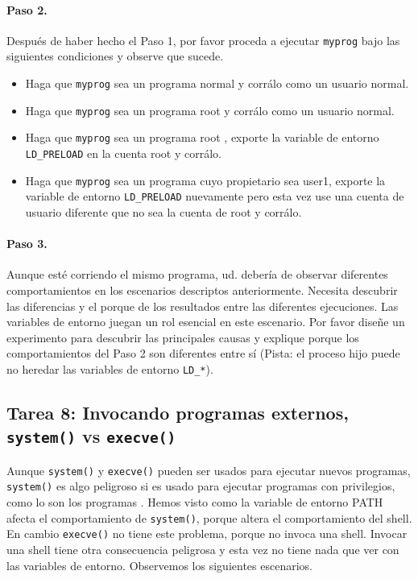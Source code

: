 \paragraph{Paso 2.}
Después de haber hecho el Paso 1, por favor proceda a ejecutar {\tt myprog} bajo las siguientes condiciones y observe que sucede.

  \begin{itemize}
   \item Haga que {\tt myprog} sea un programa normal y corrálo como un usuario normal.
   \item Haga que {\tt myprog} sea un programa root \setuid y corrálo como un usuario normal.
   \item Haga que {\tt myprog} sea un programa root \setuid, exporte la variable de entorno {\tt LD\_PRELOAD} en la cuenta root y corrálo.
  \item Haga que {\tt myprog} sea un programa \setuid cuyo propietario sea user1,
  exporte la variable de entorno {\tt LD\_PRELOAD}  nuevamente pero esta vez use una cuenta de usuario diferente que no sea la cuenta de root y corrálo.
  \end{itemize}


\paragraph{Paso 3.}
Aunque esté corriendo el mismo programa, ud. debería de observar diferentes comportamientos en los escenarios descriptos anteriormente. Necesita descubrir las diferencias y el porque de los resultados entre las diferentes ejecuciones. Las variables de entorno juegan un rol esencial en este escenario. Por favor diseñe un experimento para descubrir las principales causas y explique porque los comportamientos del Paso 2 son diferentes entre sí (Pista: el proceso hijo puede no heredar las variables de entorno {\tt LD\_*}).



\subsection{Tarea 8: Invocando programas externos, {\tt system()} vs {\tt execve()}}

Aunque {\tt system()} y {\tt execve()} pueden ser usados para ejecutar nuevos programas, {\tt system()} es algo peligroso si es usado para ejecutar programas con privilegios, como lo son los programas \setuid. Hemos visto como la variable de entorno PATH afecta el comportamiento de {\tt system()}, porque altera el comportamiento del shell. En cambio {\tt execve()} no tiene este problema, porque no invoca una shell. Invocar una shell tiene otra consecuencia peligrosa y esta vez no tiene nada que ver con las variables de entorno. Observemos los siguientes escenarios.

